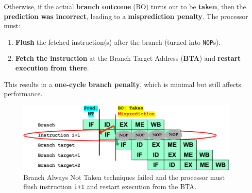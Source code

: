 \highspace
Otherwise, if the actual \textbf{branch outcome} (BO) turns out to be \textbf{taken}, then the \textbf{prediction was incorrect}, leading to a \textbf{misprediction penalty}. The processor must:
\begin{enumerate}
    \item \textbf{Flush} the fetched instruction(s) after the branch (turned into \texttt{NOP}s).
    \item \textbf{Fetch the instruction} at the Branch Target Address (\textbf{BTA}) and \textbf{restart execution from there}.
\end{enumerate}
This results in a \textcolor{Red2}{\textbf{one-cycle branch penalty}}, which is minimal but still affects performance.

\newpage

\begin{figure}[!htp]
    \centering
    \includegraphics[width=\textwidth]{img/branch-always-not-taken.pdf}
    \caption{Branch Always Not Taken techniques failed and the processor must flush instruction \texttt{i+1} and restart execution from the BTA.}
\end{figure}